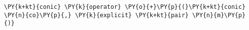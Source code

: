 \begin{Verbatim}[commandchars=\\\{\}]
    \PY{k+kt}{conic} \PY{k}{operator} \PY{o}{+}\PY{p}{(}\PY{k+kt}{conic} \PY{n}{co}\PY{p}{,} \PY{k}{explicit} \PY{k+kt}{pair} \PY{n}{m}\PY{p}{)}
\end{Verbatim}
